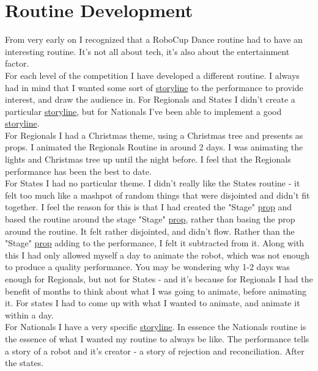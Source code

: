 \part{Routine Development}
	From very early on I recognized that a RoboCup Dance routine had to have an interesting routine. It's not all about tech, it's also about the entertainment factor.\\
    
    For each level of the competition I have developed a different routine. I always had in mind that I wanted some sort of \hyperref[Story]{storyline} to the performance to provide interest, and draw the audience in. For Regionals and States I didn't create a particular \hyperref[Story]{storyline}, but for Nationals I've been able to implement a good \hyperref[Story]{storyline}.\\
    
    For Regionals I had a Christmas theme, using a Christmas tree and presents as props. I animated the Regionals Routine in around 2 days. I was animating the lights and Christmas tree up until the night before. I feel that the Regionals performance has been the best to date.\\
    
    For States I had no particular theme. I didn't really like the States routine - it felt too much like a mashpot of random things that were disjointed and didn't fit together. I feel the reason for this is that I had created the "Stage" \hyperref[Props]{prop} and based the routine around the stage "Stage" \hyperref[Props]{prop}, rather than basing the prop around the routine. It felt rather disjointed, and didn't flow. Rather than the "Stage" \hyperref[Props]{prop} adding to the performance, I felt it subtracted from it. Along with this I had only allowed myself a day to animate the robot, which was not enough to produce a quality performance. You may be wondering why 1-2 days was enough for Regionals, but not for States - and it's because for Regionals I had the benefit of months to think about what I was going to animate, before animating it. For states I had to come up with what I wanted to animate, and animate it within a day.\\
    
    For Nationals I have a very specific \hyperref[Story]{storyline}. In essence the Nationals routine is the essence of what I wanted my routine to always be like. The performance tells a story of a robot and it's creator - a story of rejection and reconciliation. After the states. \\
    
